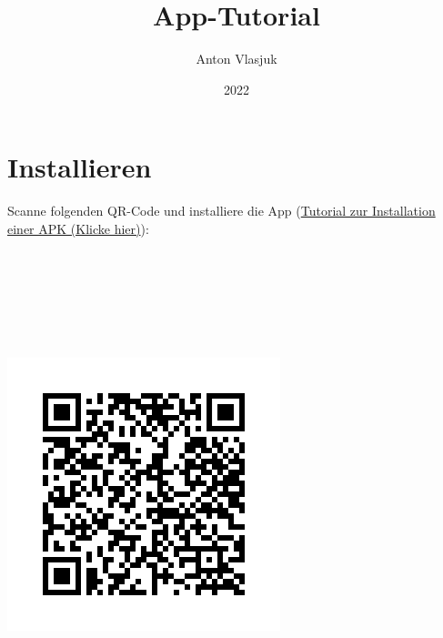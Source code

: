 \documentclass{article}
\title{App-Tutorial}
\author{Anton Vlasjuk}
\date{2022}
\begin{document}
\tableofcontents
\maketitle


\section{Installieren}
Scanne folgenden QR-Code und installiere die App (\href{https://www.heise.de/tipps-tricks/Externe-Apps-APK-Dateien-bei-Android-installieren-so-klappt-s-3714330.html}{Tutorial zur Installation einer APK (Klicke hier)}):
\\ \\ \\ \\ \\ \\ \\ 
\begin{center}
    \includegraphics[scale=0.6]{frame.png}
\end{center}



\newpage
\end{document}
